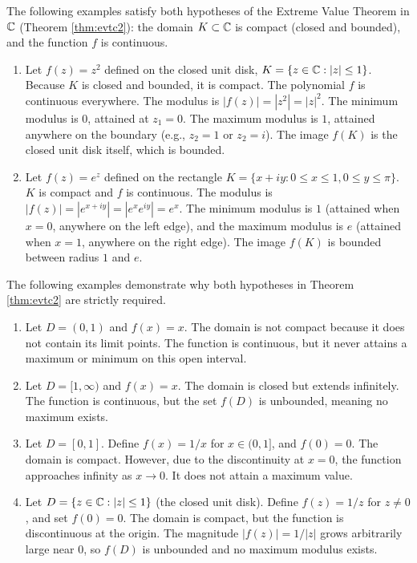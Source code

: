 \documentclass[../analysis1.tex]{subfiles}
\begin{document}
\begin{example}
    The following examples satisfy both hypotheses of the Extreme Value Theorem in $\mathbb{C}$ (Theorem \ref{thm:evtc2}): the domain $K \subset \mathbb{C}$ is compact (closed and bounded), and the function $f$ is continuous.
    \begin{enumerate}
        \item[1.]Let $f(z) = z^2$ defined on the closed unit disk, $K = \{z \in \mathbb{C} : |z| \le 1\}$. 
        Because $K$ is closed and bounded, it is compact. The polynomial $f$ is continuous everywhere. The modulus is $|f(z)| = |z^2| = |z|^2$. 
        The minimum modulus is $0$, attained at $z_1 = 0$. The maximum modulus is $1$, attained anywhere on the boundary (e.g., $z_2 = 1$ or $z_2 = i$). The image $f(K)$ is the closed unit disk itself, which is bounded.
        \item[2.] Let $f(z) = e^z$ defined on the rectangle $K = \{x + iy : 0 \le x \le 1, 0 \le y \le \pi\}$. 
        $K$ is compact and $f$ is continuous. The modulus is $|f(z)| = |e^{x+iy}| = |e^x e^{iy}| = e^x$. 
        The minimum modulus is $1$ (attained when $x=0$, anywhere on the left edge), and the maximum modulus is $e$ (attained when $x=1$, anywhere on the right edge). The image $f(K)$ is bounded between radius $1$ and $e$.
    \end{enumerate}
\end{example}

\begin{example}
    The following examples demonstrate why both hypotheses in Theorem \ref{thm:evtc2} are strictly required.
    \begin{enumerate}
        \item[1.] Let $D = (0, 1)$ and $f(x) = x$. The domain is not compact because it does not contain its limit points. The function is continuous, but it never attains a maximum or minimum on this open interval.
        \item[2.] Let $D = [1, \infty)$ and $f(x) = x$. The domain is closed but extends infinitely. The function is continuous, but the set $f(D)$ is unbounded, meaning no maximum exists.
        \item[3.] Let $D = [0, 1]$. Define $f(x) = 1/x$ for $x \in (0, 1]$, and $f(0) = 0$. The domain is compact. However, due to the discontinuity at $x=0$, the function approaches infinity as $x \to 0$. It does not attain a maximum value.
        \item[4.] Let $D = \{z \in \mathbb{C} : |z| \le 1\}$ (the closed unit disk). Define $f(z) = 1/z$ for $z \neq 0$, and set $f(0) = 0$. The domain is compact, but the function is discontinuous at the origin. The magnitude $|f(z)| = 1/|z|$ grows arbitrarily large near $0$, so $f(D)$ is unbounded and no maximum modulus exists. 
    \end{enumerate}
\end{example}
\end{document}
